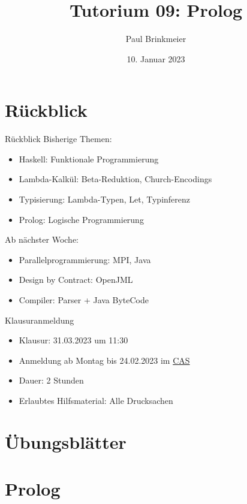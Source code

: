 \documentclass{beamer}
\title{Tutorium 09: Prolog}
\author{Paul Brinkmeier}
\institute{Tutorium Programmierparadigmen am KIT}
\date{10. Januar 2023}
\begin{document}
\begin{frame}
    \titlepage
\end{frame}

\section{Rückblick}

\begin{frame}{Rückblick}
    Bisherige Themen:

    \begin{itemize}
        \item Haskell: Funktionale Programmierung
        \item Lambda-Kalkül: Beta-Reduktion, Church-Encodings
        \item Typisierung: Lambda-Typen, Let, Typinferenz
        \item Prolog: Logische Programmierung
    \end{itemize}

    Ab nächster Woche:

    \begin{itemize}
        \item Parallelprogrammierung: MPI, Java
        \item Design by Contract: OpenJML
        \item Compiler: Parser + Java ByteCode
    \end{itemize}
\end{frame}

\begin{frame}{Klausuranmeldung}
    \begin{itemize}
        \item Klausur: 31.03.2023 um 11:30
        \item Anmeldung ab Montag bis 24.02.2023 im \href{https://campus.studium.kit.edu/exams/registration.php?pguid=0x87BA4E33FD4947E8ADAB43370BDFA852}{CAS}
        \item Dauer: 2 Stunden
        \item Erlaubtes Hilfsmaterial: Alle Drucksachen
    \end{itemize}
\end{frame}

\section{Übungsblätter}

\section{Prolog}
\end{document}

